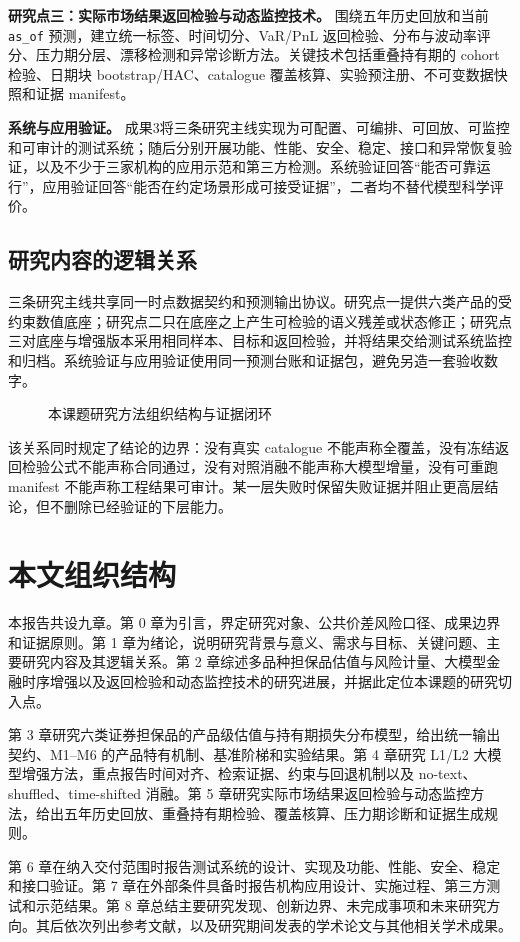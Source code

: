 \textbf{研究点三：实际市场结果返回检验与动态监控技术。}
围绕五年历史回放和当前 \texttt{as\_of} 预测，建立统一标签、时间切分、VaR/PnL 返回检验、分布与波动率评分、压力期分层、漂移检测和异常诊断方法。关键技术包括重叠持有期的 cohort 检验、日期块 bootstrap/HAC、catalogue 覆盖核算、实验预注册、不可变数据快照和证据 manifest。

\textbf{系统与应用验证。}
成果3将三条研究主线实现为可配置、可编排、可回放、可监控和可审计的测试系统；随后分别开展功能、性能、安全、稳定、接口和异常恢复验证，以及不少于三家机构的应用示范和第三方检测。系统验证回答“能否可靠运行”，应用验证回答“能否在约定场景形成可接受证据”，二者均不替代模型科学评价。

\subsection{研究内容的逻辑关系}

三条研究主线共享同一时点数据契约和预测输出协议。研究点一提供六类产品的受约束数值底座；研究点二只在底座之上产生可检验的语义残差或状态修正；研究点三对底座与增强版本采用相同样本、目标和返回检验，并将结果交给测试系统监控和归档。系统验证与应用验证使用同一预测台账和证据包，避免另造一套验收数字。

\begin{figure}[htbp]
  \centering
  \resizebox{\textwidth}{!}{}
  \caption{本课题研究方法组织结构与证据闭环}
  \label{fig:research-logic}
\end{figure}

该关系同时规定了结论的边界：没有真实 catalogue 不能声称全覆盖，没有冻结返回检验公式不能声称合同通过，没有对照消融不能声称大模型增量，没有可重跑 manifest 不能声称工程结果可审计。某一层失败时保留失败证据并阻止更高层结论，但不删除已经验证的下层能力。

\section{本文组织结构}

本报告共设九章。第 0 章为引言，界定研究对象、公共价差风险口径、成果边界和证据原则。第 1 章为绪论，说明研究背景与意义、需求与目标、关键问题、主要研究内容及其逻辑关系。第 2 章综述多品种担保品估值与风险计量、大模型金融时序增强以及返回检验和动态监控技术的研究进展，并据此定位本课题的研究切入点。

第 3 章研究六类证券担保品的产品级估值与持有期损失分布模型，给出统一输出契约、M1--M6 的产品特有机制、基准阶梯和实验结果。第 4 章研究 L1/L2 大模型增强方法，重点报告时间对齐、检索证据、约束与回退机制以及 no-text、shuffled、time-shifted 消融。第 5 章研究实际市场结果返回检验与动态监控方法，给出五年历史回放、重叠持有期检验、覆盖核算、压力期诊断和证据生成规则。

第 6 章在纳入交付范围时报告测试系统的设计、实现及功能、性能、安全、稳定和接口验证。第 7 章在外部条件具备时报告机构应用设计、实施过程、第三方测试和示范结果。第 8 章总结主要研究发现、创新边界、未完成事项和未来研究方向。其后依次列出参考文献，以及研究期间发表的学术论文与其他相关学术成果。

